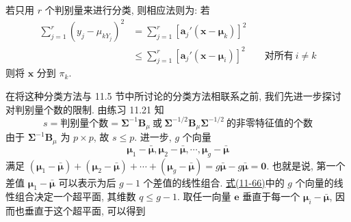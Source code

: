 若只用 $r$ 个判别量来进行分类, 则相应法则为: 若
\label{eq:11-65}
\begin{equation}
\begin{aligned}
\sum_{j=1}^{r}(y_j-\mu_{kY_j})^2&=\sum_{j=1}^{r}[\mathbf{a}_j'(\mathbf{x}-\boldsymbol{\mu}_k)]^2\\
&\le\sum_{j=1}^{r}[\mathbf{a}_j'(\mathbf{x}-\boldsymbol{\mu}_i)]^2\qquad \text{对所有}\ i\ne k
\end{aligned}
\tag{11-65}
\end{equation}
则将 $\mathbf{x}$ 分到 $\pi_k$.

在将这种分类方法与 11.5 节中所讨论的分类方法相联系之前, 我们先进一步探讨对判别量个数的限制. 由练习 11.21 知
\[
s=\text{判别量个数}=\boldsymbol{\Sigma}^{-1}\mathbf{B}_\mu\ \text{或}\ \boldsymbol{\Sigma}^{-1/2}\mathbf{B}_\mu\boldsymbol{\Sigma}^{-1/2}\ \text{的非零特征值的个数}
\]
由于 $\boldsymbol{\Sigma}^{-1}\mathbf{B}_\mu$ 为 $p\times p$, 故 $s\le p$. 进一步, $g$ 个向量
\label{eq:11-66}
\begin{equation}
\boldsymbol{\mu}_1-\bar{\boldsymbol{\mu}},\boldsymbol{\mu}_2-\bar{\boldsymbol{\mu}},\cdots,\boldsymbol{\mu}_g-\bar{\boldsymbol{\mu}}
\tag{11-66}
\end{equation}
满足 $(\boldsymbol{\mu}_1-\bar{\boldsymbol{\mu}})+(\boldsymbol{\mu}_2-\bar{\boldsymbol{\mu}})+\cdots+(\boldsymbol{\mu}_g-\bar{\boldsymbol{\mu}})=g\bar{\boldsymbol{\mu}}-g\bar{\boldsymbol{\mu}}=\mathbf{0}$. 也就是说, 第一个差值 $\boldsymbol{\mu}_1-\bar{\boldsymbol{\mu}}$ 可以表示为后 $g-1$ 个差值的线性组合. \hyperref[eq:11-66]{式(11-66)}中的 $g$ 个向量的线性组合决定一个超平面, 其维数 $q\le g-1$. 取任一向量 $\mathbf{e}$ 垂直于每一个 $\boldsymbol{\mu}_i-\bar{\boldsymbol{\mu}}$, 因而也垂直于这个超平面, 可以得到
